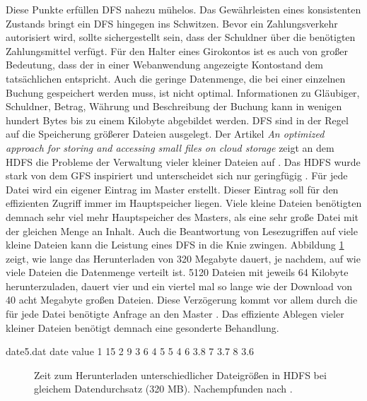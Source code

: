 \documentclass[12pt,oneside,a4paper,parskip]{scrbook}
\begin{document}
Diese Punkte erfüllen DFS nahezu mühelos. Das Gewährleisten eines konsistenten Zustands bringt ein DFS hingegen ins Schwitzen. Bevor ein Zahlungsverkehr autorisiert wird, sollte sichergestellt sein, dass der Schuldner über die benötigten Zahlungsmittel verfügt. Für den Halter eines Girokontos ist es auch von großer Bedeutung, dass der in einer Webanwendung angezeigte Kontostand dem tatsächlichen entspricht. Auch die geringe Datenmenge, die bei einer einzelnen Buchung gespeichert werden muss, ist nicht optimal. Informationen zu Gläubiger, Schuldner, Betrag, Währung und Beschreibung der Buchung kann in wenigen hundert Bytes bis zu einem Kilobyte abgebildet werden. DFS sind in der Regel auf die Speicherung größerer Dateien ausgelegt. Der Artikel \textit{An optimized approach for storing and accessing small files on cloud storage} zeigt an dem HDFS die Probleme der Verwaltung vieler kleiner Dateien auf \cite{hdfsSmallFiles}. Das HDFS wurde stark von dem GFS inspiriert und unterscheidet sich nur geringfügig \cite{hdfsGfs}. Für jede Datei wird ein eigener Eintrag im Master erstellt. Dieser Eintrag soll für den effizienten Zugriff immer im Hauptspeicher liegen. Viele kleine Dateien benötigten demnach sehr viel mehr Hauptspeicher des Masters, als eine sehr große Datei mit der gleichen Menge an Inhalt. Auch die Beantwortung von Lesezugriffen auf viele kleine Dateien kann die Leistung eines DFS in die Knie zwingen. Abbildung \ref{hdfsSmallFiles} zeigt, wie lange das Herunterladen von 320 Megabyte dauert, je nachdem, auf wie viele Dateien die Datenmenge verteilt ist. 5120 Dateien mit jeweils 64 Kilobyte herunterzuladen, dauert vier und ein viertel mal so lange wie der Download von 40 acht Megabyte großen Dateien. Diese Verzögerung kommt vor allem durch die für jede Datei benötigte Anfrage an den Master \cite{hdfsSmallFiles}. Das effiziente Ablegen vieler kleiner Dateien benötigt demnach eine gesonderte Behandlung.



\begin{filecontents}{date5.dat}
date  value
1   15
2   9
3   6
4   5
5   4
6   3.8
7   3.7
8   3.6
\end{filecontents}


\begin{figure}
\begin{center}
\caption[Zeit zum Herunterladen unterschiedlicher Dateigrößen in HDFS]{Zeit zum Herunterladen unterschiedlicher Dateigrößen in HDFS bei gleichem Datendurchsatz (320 MB). Nachempfunden nach \cite{hdfsSmallFiles}.}
\label{hdfsSmallFiles}
\end{center}
\end{figure}
\end{document}
